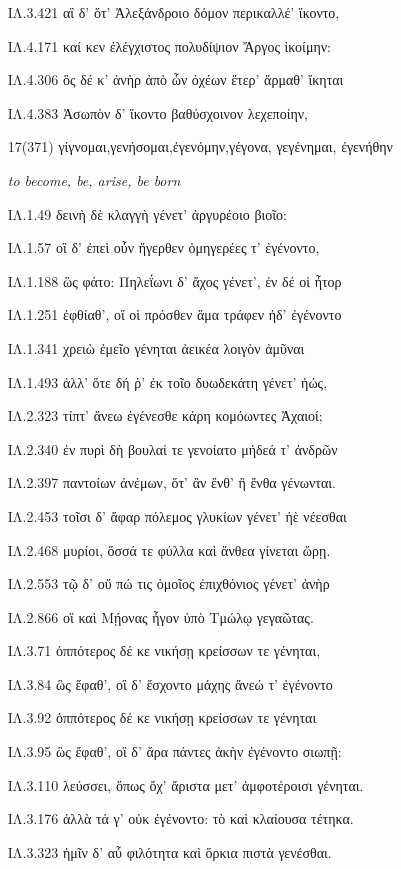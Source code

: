 \begin{enumerate}
{ΙΛ.3.421 αἳ δ' ὅτ' Ἀλεξάνδροιο δόμον περικαλλέ' ἵκοντο,

ΙΛ.4.171 καί κεν ἐλέγχιστος πολυδίψιον Ἄργος ἱκοίμην:

ΙΛ.4.306 ὃς δέ κ' ἀνὴρ ἀπὸ ὧν ὀχέων ἕτερ' ἅρμαθ' ἵκηται

ΙΛ.4.383 Ἀσωπὸν δ' ἵκοντο βαθύσχοινον λεχεποίην,

}

\clearpage
\item[\large 17(371)]{\large \g γίγνομαι,γενήσομαι,ἐγενόμην,γέγονα, γεγένημαι,
ἐγενήθην}

\hspace{0.2cm} \textit{to become, be, arise, be born}

{\g
ΙΛ.1.49 δεινὴ δὲ κλαγγὴ γένετ' ἀργυρέοιο βιοῖο:

ΙΛ.1.57 οἳ δ' ἐπεὶ οὖν ἤγερθεν ὁμηγερέες τ' ἐγένοντο,

ΙΛ.1.188 ὣς φάτο: Πηλεΐωνι δ' ἄχος γένετ', ἐν δέ οἱ ἦτορ

ΙΛ.1.251 ἐφθίαθ', οἵ οἱ πρόσθεν ἅμα τράφεν ἠδ' ἐγένοντο

ΙΛ.1.341 χρειὼ ἐμεῖο γένηται ἀεικέα λοιγὸν ἀμῦναι

ΙΛ.1.493 ἀλλ' ὅτε δή ῥ' ἐκ τοῖο δυωδεκάτη γένετ' ἠώς,

ΙΛ.2.323 τίπτ' ἄνεω ἐγένεσθε κάρη κομόωντες Ἀχαιοί;

ΙΛ.2.340 ἐν πυρὶ δὴ βουλαί τε γενοίατο μήδεά τ' ἀνδρῶν

ΙΛ.2.397 παντοίων ἀνέμων, ὅτ' ἂν ἔνθ' ἢ ἔνθα γένωνται.

ΙΛ.2.453 τοῖσι δ' ἄφαρ πόλεμος γλυκίων γένετ' ἠὲ νέεσθαι

ΙΛ.2.468 μυρίοι, ὅσσά τε φύλλα καὶ ἄνθεα γίνεται ὥρῃ.

ΙΛ.2.553 τῷ δ' οὔ πώ τις ὁμοῖος ἐπιχθόνιος γένετ' ἀνὴρ

ΙΛ.2.866 οἳ καὶ Μῄονας ἦγον ὑπὸ Τμώλῳ γεγαῶτας.

ΙΛ.3.71 ὁππότερος δέ κε νικήσῃ κρείσσων τε γένηται,

ΙΛ.3.84 ὣς ἔφαθ', οἳ δ' ἔσχοντο μάχης ἄνεώ τ' ἐγένοντο

ΙΛ.3.92 ὁππότερος δέ κε νικήσῃ κρείσσων τε γένηται

ΙΛ.3.95 ὣς ἔφαθ', οἳ δ' ἄρα πάντες ἀκὴν ἐγένοντο σιωπῇ:

ΙΛ.3.110 λεύσσει, ὅπως ὄχ' ἄριστα μετ' ἀμφοτέροισι γένηται.

ΙΛ.3.176 ἀλλὰ τά γ' οὐκ ἐγένοντο: τὸ καὶ κλαίουσα τέτηκα.

ΙΛ.3.323 ἡμῖν δ' αὖ φιλότητα καὶ ὅρκια πιστὰ γενέσθαι.

}
\end{enumerate}
